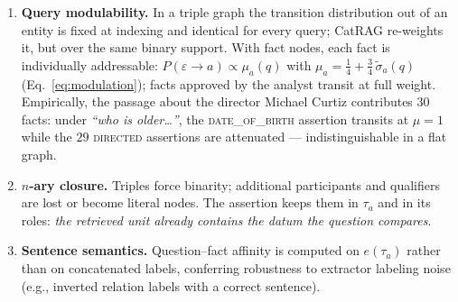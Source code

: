 \documentclass[11pt,a4paper]{article}
\begin{document}
\begin{enumerate}[leftmargin=1.6em,itemsep=2pt]
\item \textbf{Query modulability.} In a triple graph the transition
  distribution out of an entity is fixed at indexing and identical for every
  query; CatRAG re-weights it, but over the same binary support. With
  fact nodes, each fact is individually addressable:
  $P(\varepsilon\!\to\!a)\propto\mu_a(q)$ with
  $\mu_a=\tfrac14+\tfrac34\,\tilde\sigma_a(q)$
  (Eq.~\ref{eq:modulation}); facts approved by the analyst transit at full
  weight. Empirically, the passage about the director Michael Curtiz
  contributes $30$ facts: under \emph{``who is older\dots''}, the
  \textsc{date\_of\_birth} assertion transits at $\mu{=}1$ while the $29$
  \textsc{directed} assertions are attenuated --- indistinguishable in a flat
  graph.
\item \textbf{$n$-ary closure.} Triples force binarity; additional
  participants and qualifiers are lost or become literal nodes. The assertion
  keeps them in $\tau_a$ and in its roles: \emph{the retrieved unit already
  contains the datum the question compares}.
\item \textbf{Sentence semantics.} Question--fact affinity is computed on
  $e(\tau_a)$ rather than on concatenated labels, conferring robustness to
  extractor labeling noise (e.g., inverted relation labels with a correct
  sentence).
\end{enumerate}
\end{document}
